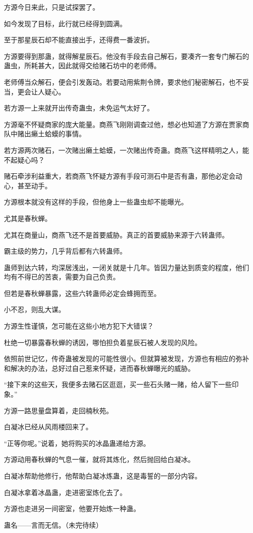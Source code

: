 \begin{this_body}
方源今日来此，只是试探罢了。

如今发现了目标，此行就已经得到圆满。

至于那星辰石却不能直接出手，还得费一番波折。

方源要得到那蛊，就得解星辰石。他没有手段去自己解石，要凑齐一套专门解石的蛊虫，所耗甚大，因此就得交给赌石坊中的老师傅。

老师傅当众解石，便会引发轰动。若要动用紫荆令牌，要求他们秘密解石，也不妥当，更会让人疑心。

若方源一上来就开出传奇蛊虫，未免运气太好了。

方源毫不怀疑商家的庞大能量。商燕飞刚刚调查过他，想必也知道了方源在贾家商队中赌出癞土蛤蟆的事情。

若方源两次赌石，一次赌出癞土蛤蟆，一次赌出传奇蛊。商燕飞这样精明之人，能不起疑心吗？

赌石牵涉利益重大，若商燕飞怀疑方源有手段可测石中是否有蛊，那他必定会动心，甚至动手。

方源根本就没有这样的手段，但他身上一些蛊虫却不能曝光。

尤其是春秋蝉。

尤其在商量山，商燕飞还不是首要威胁。真正的首要威胁来源于六转蛊师。

霸主级的势力，几乎背后都有六转蛊师。

蛊师到达六转，均深居浅出，一闭关就是十几年。皆因力量达到质变的程度，他们均有不得已的苦衷，需要为自己负责。

但若是春秋蝉暴露，这些六转蛊师必定会蜂拥而至。

小不忍，则乱大谋。

方源生性谨慎，怎可能在这些小地方犯下大错误？

杜绝一切暴露春秋蝉的诱因，哪怕担负着星辰石被人发现的风险。

依照前世记忆，传奇蛊被发现的可能性很小。但就算被发现，方源也有相应的弥补和解决的办法，总好过自己惹来怀疑，进而春秋蝉曝光的威胁。

“接下来的这些天，我便多去赌石区逛逛，买一些石头赌一赌，给人留下一些印象。”

方源一路思量盘算着，走回楠秋苑。

白凝冰已经从风雨楼回来了。

“正等你呢。”说着，她将购买的冰晶蛊递给方源。

方源动用春秋蝉的气息一催，就将其炼化，然后抛回给白凝冰。

白凝冰帮助他修行，他帮助白凝冰炼蛊，这是毒誓的一部分内容。

白凝冰拿着冰晶蛊，走进密室炼化去了。

方源也走进另一间密室，他要开始炼一种蛊。

蛊名——言而无信。（未完待续）

\end{this_body}

